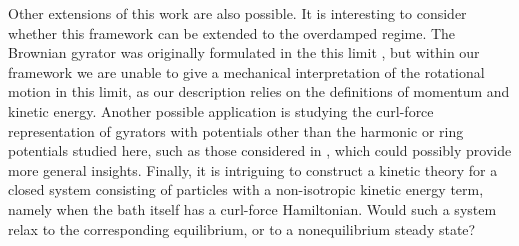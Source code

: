 Other extensions of this work are also possible. It is interesting to consider whether this framework can be extended to the overdamped regime. The Brownian gyrator was originally formulated in the this limit \cite{filliger2007brownian}, but within our framework we are unable to give a mechanical interpretation of the rotational motion in this limit, as our description relies on the definitions of momentum and kinetic energy. Another possible application is studying the curl-force representation of gyrators with potentials other than the harmonic or ring potentials studied here, such as those considered in \cite{chang2021autonomous}, which could possibly provide more general insights. Finally, it is intriguing to construct a kinetic theory for a closed system consisting of particles with a non-isotropic kinetic energy term, namely when the bath itself has a curl-force Hamiltonian. Would such a system relax to the corresponding equilibrium, or to a nonequilibrium steady state? 